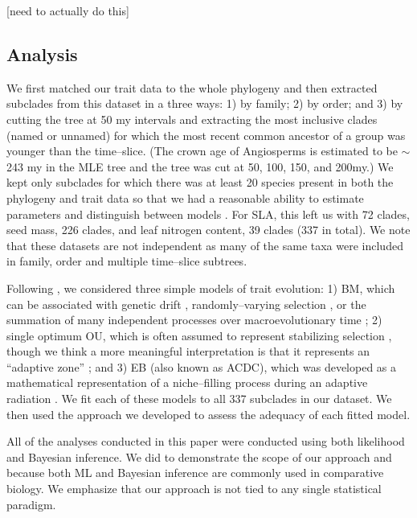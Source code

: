 \documentclass[a4paper,11pt]{article}
\begin{document}
[need to actually do this]

\subsection{Analysis}

We first matched our trait data to the whole phylogeny and then extracted subclades from this dataset in a three ways: 1) by family; 2) by order; and 3) by cutting the tree at 50 my intervals and extracting the most inclusive clades (named or unnamed) for which the most recent common ancestor of a group was younger than the time--slice. 
(The crown age of Angiosperms is estimated to be $\sim$243 my in the MLE tree and the tree was cut at 50, 100, 150, and 200my.) We kept only subclades for which there was at least 20 species present in both the phylogeny and trait data so that we had a reasonable ability to estimate parameters and distinguish between models \citep{Boettiger2012, SlaterPennell}. 
For SLA, this left us with 72 clades, seed mass, 226 clades, and leaf nitrogen content, 39 clades (337 in total). We note that these datasets are not independent as many of the same taxa were included in family, order and multiple time--slice subtrees. 

Following \citet{Harmon2010}, we considered three simple models of trait evolution: 1) BM, which can be associated with genetic drift \citep{Lande1976, Felsenstein1988, Lynch1990, HansenMartins1996}, randomly--varying selection \citep{Felsenstein1973}, or the summation of many independent processes over macroevolutionary time \citep{HansenMartins1996, Uyeda2011, PennellPE}; 2) single optimum OU, which is often assumed to represent stabilizing selection \citep[following][]{Lande1976}, though we think a more meaningful interpretation is that it represents an ``adaptive zone'' \citep{Hansen2012book, PennellHarmon}; and 3) EB (also known as ACDC), which was developed as a mathematical representation of a niche--filling process during an adaptive radiation \citep{Blomberg2003, Harmon2010}. We fit each of these models to all 337 subclades in our dataset. We then used the approach we developed to assess the adequacy of each fitted model. 

All of the analyses conducted in this paper were conducted using both likelihood and Bayesian inference. We did to demonstrate the scope of our approach and because both ML and Bayesian inference are commonly used in comparative biology. We emphasize that our approach is not tied to any single statistical paradigm.
\end{document}
